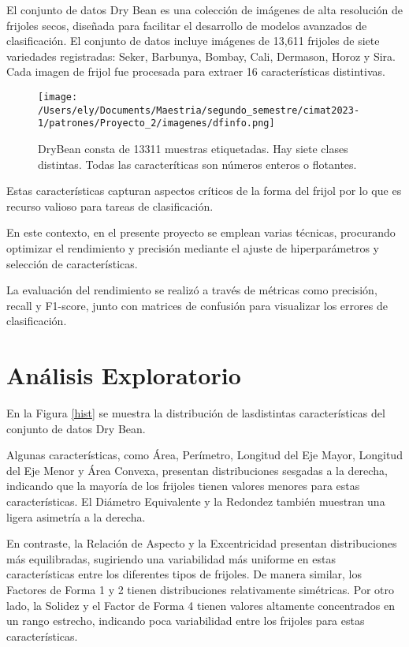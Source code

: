 \documentclass[letterpaper,spanish,reprint,nofootinbib,showkeys,aps]{revtex4-2}
\begin{document}
El conjunto de datos Dry Bean es una colección de imágenes de alta resolución de frijoles secos, diseñada para facilitar el desarrollo de modelos avanzados de clasificación. El conjunto de datos incluye imágenes de 13,611 frijoles de siete variedades registradas: Seker, Barbunya, Bombay, Cali, Dermason, Horoz y Sira. Cada imagen de frijol fue procesada para extraer 16 características distintivas. 

\begin{figure} [H]
	\begin{center}
		\texttt{[image: /Users/ely/Documents/Maestria/segundo\_semestre/cimat2023-1/patrones/Proyecto\_2/imagenes/dfinfo.png]}
		\caption{DryBean consta de 13311 muestras etiquetadas. Hay siete clases distintas. Todas las caracteríticas son números enteros o flotantes.}
		\label{res} 
   \end{center} 
\end{figure}

Estas características capturan aspectos críticos de la forma del frijol por lo que es recurso valioso para tareas de clasificación.

En este contexto, en el presente proyecto se emplean varias técnicas, procurando optimizar el rendimiento y precisión mediante el ajuste de hiperparámetros y selección de características.

La evaluación del rendimiento se realizó a través de métricas como precisión, recall y F1-score, junto con matrices de confusión para visualizar los errores de clasificación. 





\section{Análisis Exploratorio }

En la Figura \ref{hist} se muestra la distribución de lasdistintas características del conjunto de datos Dry Bean. 

Algunas características, como Área, Perímetro, Longitud del Eje Mayor, Longitud del Eje Menor y Área Convexa, presentan distribuciones sesgadas a la derecha, indicando que la mayoría de los frijoles tienen valores menores para estas características. El Diámetro Equivalente y la Redondez también muestran una ligera asimetría a la derecha. 

En contraste, la Relación de Aspecto y la Excentricidad presentan distribuciones más equilibradas, sugiriendo una variabilidad más uniforme en estas características entre los diferentes tipos de frijoles. 
De manera similar, los Factores de Forma 1 y 2 tienen distribuciones relativamente simétricas. Por otro lado, la Solidez y el Factor de Forma 4 tienen valores altamente concentrados en un rango estrecho, indicando poca variabilidad entre los frijoles para estas características. 
\end{document}
